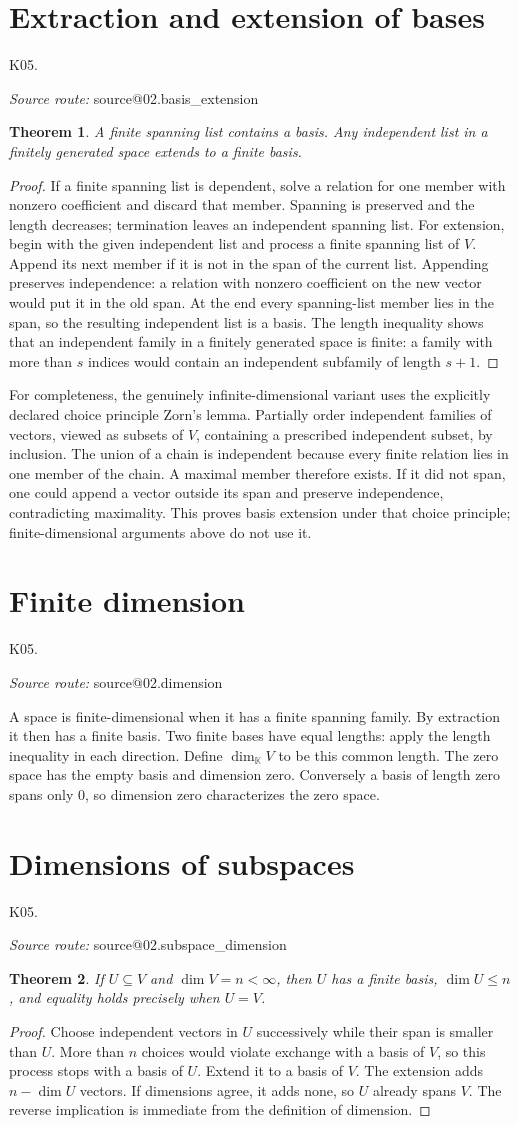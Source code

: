 \documentclass[11pt,a4paper]{book}
\makeatletter
\newtheorem{theorem}{Theorem}[chapter]
\theoremstyle{definition}\newtheorem{definition}[theorem]{Definition}
\theoremstyle{remark}\newtheorem{remark}[theorem]{Remark}
\newcommand{\K}{\mathbb K}\newcommand{\R}{\mathbb R}\newcommand{\C}{\mathbb C}
\newcommand{\Kentry}[2]{\section{#2}\label{k:#1}\noindent\textsf{\small K05.\detokenize{#1}}\par
  \begingroup\small\color{black!65}\textit{Source route: }\csname source@#1\endcsname\par\endgroup}
\makeatother
\begin{document}
\Kentry{02.basis_extension}{Extraction and extension of bases}
\begin{theorem}
A finite spanning list contains a basis. Any independent list in a finitely generated space extends to a finite basis.
\end{theorem}
\begin{proof}
If a finite spanning list is dependent, solve a relation for one member with nonzero coefficient and discard that member. Spanning is preserved and the length decreases; termination leaves an independent spanning list. For extension, begin with the given independent list and process a finite spanning list of $V$. Append its next member if it is not in the span of the current list. Appending preserves independence: a relation with nonzero coefficient on the new vector would put it in the old span. At the end every spanning-list member lies in the span, so the resulting independent list is a basis. The length inequality shows that an independent family in a finitely generated space is finite: a family with more than $s$ indices would contain an independent subfamily of length $s+1$.
\end{proof}
For completeness, the genuinely infinite-dimensional variant uses the explicitly declared choice principle Zorn's lemma. Partially order independent families of vectors, viewed as subsets of $V$, containing a prescribed independent subset, by inclusion. The union of a chain is independent because every finite relation lies in one member of the chain. A maximal member therefore exists. If it did not span, one could append a vector outside its span and preserve independence, contradicting maximality. This proves basis extension under that choice principle; finite-dimensional arguments above do not use it.

\Kentry{02.dimension}{Finite dimension}
A space is finite-dimensional when it has a finite spanning family. By extraction it then has a finite basis. Two finite bases have equal lengths: apply the length inequality in each direction. Define $\dim_\K V$ to be this common length. The zero space has the empty basis and dimension zero. Conversely a basis of length zero spans only $0$, so dimension zero characterizes the zero space.

\Kentry{02.subspace_dimension}{Dimensions of subspaces}
\begin{theorem}
If $U\subseteq V$ and $\dim V=n<\infty$, then $U$ has a finite basis, $\dim U\le n$, and equality holds precisely when $U=V$.
\end{theorem}
\begin{proof}
Choose independent vectors in $U$ successively while their span is smaller than $U$. More than $n$ choices would violate exchange with a basis of $V$, so this process stops with a basis of $U$. Extend it to a basis of $V$. The extension adds $n-\dim U$ vectors. If dimensions agree, it adds none, so $U$ already spans $V$. The reverse implication is immediate from the definition of dimension.
\end{proof}
\end{document}
